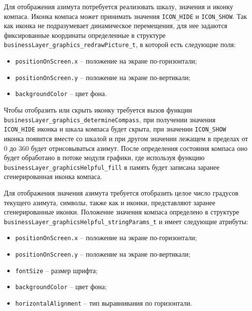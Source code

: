 Для отображения азимута потребуется реализовать шкалу, значения и иконку компаса. Иконка компаса может принимать значения \lstinline{ICON_HIDE} и \lstinline{ICON_SHOW}.
Так как иконка не подразумевает динамическое перемещения, для нее задаются фиксированные координаты определенные в структуре \lstinline{businessLayer_graphics_redrawPicture_t}, в которой есть следующие поля:

\begin{itemize}
    \item \lstinline{positionOnScreen.x} -- положение на экране по-горизонтали;
    \item \lstinline{positionOnScreen.y} -- положение на экране по-вертикали;
    \item \lstinline{backgroundColor} -- цвет фона.
\end{itemize}

Чтобы отобразить или скрыть иконку требуется вызов функции \lstinline{businessLayer_graphics_determineCompass}, при получении значения \lstinline{ICON_HIDE} иконка и шкала компаса
будет скрыта, при значении \lstinline{ICON_SHOW} иконка появится вместе со шкалой и при другом значении лежащем в пределах от 0 до 360 будет отрисовываться азимут.
После определения состояния компаса оно будет обработано в потоке модуля графики, где используя функцию \lstinline{businessLayer_graphicsHelpful_fill} в память будет записана заранее сгенерированная иконка компаса.

Для отображения значения азимута требуется отобразить целое число градусов текущего азимута, символы, также как и иконки, представляют заранее сгенерированные иконки. Положение
значения компаса определено в структуре \lstinline{businessLayer_graphicsHelpful_stringParams_t} и имеет следующие атрибуты:

\begin{itemize}
    \item \lstinline{positionOnScreen.x} -- положение на экране по-горизонтали;
    \item \lstinline{positionOnScreen.y} -- положение на экране по-вертикали;
    \item \lstinline{fontSize} -- размер шрифта;
    \item \lstinline{backgroundColor} -- цвет фона;
    \item \lstinline{horizontalAlignment} -- тип выравнивания по горизонтали.
\end{itemize}

